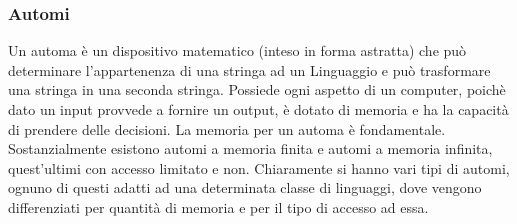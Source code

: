 \documentclass[]{article}
\begin{document}
\subsubsection{Automi}
Un automa è un dispositivo matematico (inteso in forma astratta) che può determinare l'appartenenza di una stringa ad un Linguaggio e può trasformare una stringa in una seconda stringa. Possiede ogni aspetto di un computer, poichè dato un input provvede a fornire un output, è dotato di memoria e ha la capacità di prendere delle decisioni.
\newline
La memoria per un automa è fondamentale. Sostanzialmente esistono automi a memoria finita e automi a memoria infinita, quest'ultimi con accesso limitato e non.
\newline Chiaramente si hanno vari tipi di automi, ognuno di questi adatti ad una determinata classe di linguaggi, dove vengono differenziati per quantità di memoria e per il tipo di accesso ad essa.
\end{document}
